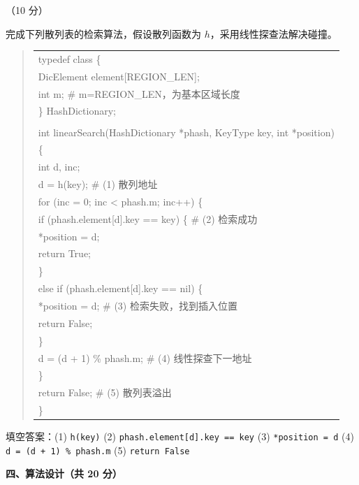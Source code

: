\begin{question}[散列表检索]（10 分）

完成下列散列表的检索算法，假设散列函数为 $h$，采用线性探查法解决碰撞。

\begin{quote}
\footnotesize
\begin{tabular}{@{}l@{}}
typedef class \{\\
    DicElement element[REGION\_LEN];\\
    int m;  \# m=REGION\_LEN，为基本区域长度\\
\} HashDictionary;\\
\\
int linearSearch(HashDictionary *phash, KeyType key, int *position)\\
\{\\
    int d, inc;\\
    d = h(key);                               \# (1) 散列地址\\
    for (inc = 0; inc < phash.m; inc++) \{\\
        if (phash.element[d].key == key) \{   \# (2) 检索成功\\
            *position = d;\\
            return True;\\
        \}\\
        else if (phash.element[d].key == nil) \{\\
            *position = d;                    \# (3) 检索失败，找到插入位置\\
            return False;\\
        \}\\
        d = (d + 1) \% phash.m;              \# (4) 线性探查下一地址\\
    \}\\
    return False;                             \# (5) 散列表溢出\\
\}\\
\end{tabular}
\end{quote}

\begin{solution}
填空答案：(1) \texttt{h(key)} (2) \texttt{phash.element[d].key == key} (3) \texttt{*position = d} (4) \texttt{d = (d + 1) \% phash.m} (5) \texttt{return False}
\end{solution}
\end{question}

\clearpage

\textbf{四、算法设计（共 20 分）}

